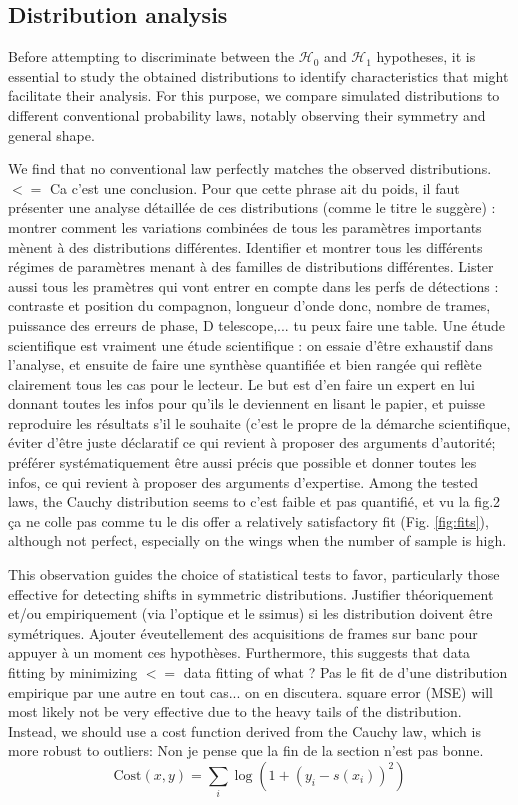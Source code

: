 \documentclass{article}
\newcommand{\dm}[1]{{\color{mulberry} #1}}
\begin{document}
\subsection{Distribution analysis}  \label{sec:distribution_analysis}

Before attempting to discriminate between the $\mathcal{H}_0$ and $\mathcal{H}_1$ hypotheses, it is essential to study the obtained distributions to identify characteristics that might facilitate their analysis. For this purpose, we compare simulated distributions to different conventional probability laws, notably observing their symmetry and general shape.

We find that no conventional law perfectly matches the observed distributions. \dm{$<=$ Ca c'est une conclusion. Pour que cette phrase ait du poids, il faut présenter une analyse détaillée de ces distributions (comme le titre le suggère) : montrer comment les variations combinées de tous les paramètres importants mènent à des distributions différentes. Identifier et montrer tous les différents régimes de paramètres menant à des familles de distributions différentes. Lister aussi tous les pramètres qui vont entrer en compte dans les perfs de détections : contraste et position du compagnon, longueur d'onde donc, nombre de trames, puissance des erreurs de phase, D telescope,... tu peux faire une table. Une étude scientifique est vraiment une étude scientifique : on essaie d'être exhaustif dans l'analyse, et ensuite de faire une synthèse quantifiée et bien rangée qui reflète clairement tous les cas pour le lecteur. Le but est d'en faire un expert en lui donnant toutes les infos pour qu'ils le deviennent en lisant le papier, et puisse reproduire les résultats s'il le souhaite (c'est le propre de la démarche scientifique, éviter d'être juste déclaratif ce qui revient à proposer des arguments d'autorité; préférer systématiquement être aussi précis que possible et donner toutes les infos, ce qui revient à proposer des arguments d'expertise.} Among the tested laws, the Cauchy distribution seems to \dm{c'est faible et pas quantifié, et vu la fig.2 ça ne colle pas comme tu le dis} offer a relatively satisfactory fit (Fig. \ref{fig:fits}), although not perfect, especially on the wings when the number of sample is high.

This observation guides the choice of statistical tests to favor, particularly those effective for detecting shifts in symmetric distributions.\dm{Justifier théoriquement et/ou empiriquement (via l'optique et le ssimus) si les distribution doivent être symétriques. Ajouter éveutellement des acquisitions de frames sur banc pour appuyer à un moment ces hypothèses. } Furthermore, this suggests that data fitting by minimizing \dm{$<=$ data fitting of what ? Pas le fit de d'une distribution empirique par une autre en tout cas... on en discutera. }square error (MSE) will most likely not be very effective due to the heavy tails of the distribution. Instead, we should use a cost function derived from the Cauchy law, which is more robust to outliers:\dm{Non je pense que la fin de la section n'est pas bonne.}
\begin{equation}
    \text{Cost}(x, y) = \sum_i \log \left( 1 + \left( y_i - s(x_i )\right)^2 \right)
\end{equation}
\end{document}
